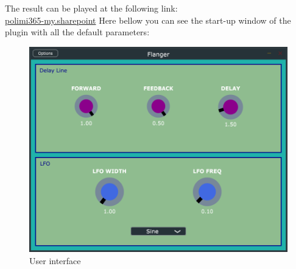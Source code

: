 \documentclass[a4paper,12pt]{report}
\begin{document}
The result can be played at the following link:\\
\href{https://polimi365-my.sharepoint.com/personal/10751438_polimi_it/_layouts/15/onedrive.aspx?id=%2Fpersonal%2F10751438%5Fpolimi%5Fit%2FDocuments%2FflangerAudioTest%2Emp3&parent=%2Fpersonal%2F10751438%5Fpolimi%5Fit%2FDocuments&originalPath=aHR0cHM6Ly9wb2xpbWkzNjUtbXkuc2hhcmVwb2ludC5jb20vOnU6L2cvcGVyc29uYWwvMTA3NTE0MzhfcG9saW1pX2l0L0VTU0cxVmRsQ1pWTXNXcEpEeUk1SmlzQlRlS1NTXzdJMTZmUmZWT3cyc0llbGc%5FcnRpbWU9Q2tNaXlIc1YyVWc}{polimi365-my.sharepoint}
\newpage Here bellow you can see the start-up window of the plugin with all the default parameters:
\begin{figure}[h]
\centering
\includegraphics[scale=0.75]{ui.png}
\caption{User interface}
\end{figure}
\end{document}
